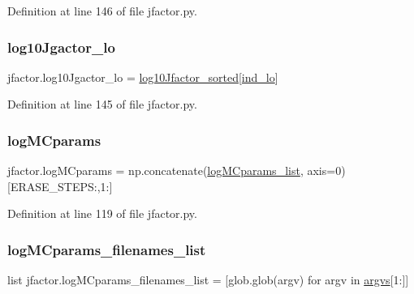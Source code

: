 Definition at line 146 of file jfactor.\+py.

\mbox{\label{namespacejfactor_a9f023e9540cdb0cd16e23b84817d50dd}} 
\subsubsection{\texorpdfstring{log10\+Jgactor\+\_\+lo}{log10Jgactor\_lo}}
{\footnotesize\ttfamily jfactor.\+log10\+Jgactor\+\_\+lo = \hyperlink{namespacejfactor_a81a38976b26f5865c633d0d078ab7796}{log10\+Jfactor\+\_\+sorted}\mbox{[}\hyperlink{namespacejfactor_aaf9c1c756ff45c03f48ccc922857360f}{ind\+\_\+lo}\mbox{]}}



Definition at line 145 of file jfactor.\+py.

\mbox{\label{namespacejfactor_a1c0eda6de5a29ea1a33584eb69690477}} 
\subsubsection{\texorpdfstring{log\+M\+Cparams}{logMCparams}}
{\footnotesize\ttfamily jfactor.\+log\+M\+Cparams = np.\+concatenate(\hyperlink{namespacejfactor_a025ed272933b6b6f31f688649810e704}{log\+M\+Cparams\+\_\+list}, axis=0)\mbox{[}E\+R\+A\+S\+E\+\_\+\+S\+T\+E\+P\+S\+:,1\+:\mbox{]}}



Definition at line 119 of file jfactor.\+py.

\mbox{\label{namespacejfactor_a32ed195f2e906262c560b25bbc440b00}} 
\subsubsection{\texorpdfstring{log\+M\+Cparams\+\_\+filenames\+\_\+list}{logMCparams\_filenames\_list}}
{\footnotesize\ttfamily list jfactor.\+log\+M\+Cparams\+\_\+filenames\+\_\+list = \mbox{[}glob.\+glob(argv) for argv in \hyperlink{namespacejfactor_a2f38906b89281fb8e6cdc4cbc9c8735e}{argvs}\mbox{[}1\+:\mbox{]}\mbox{]}}



